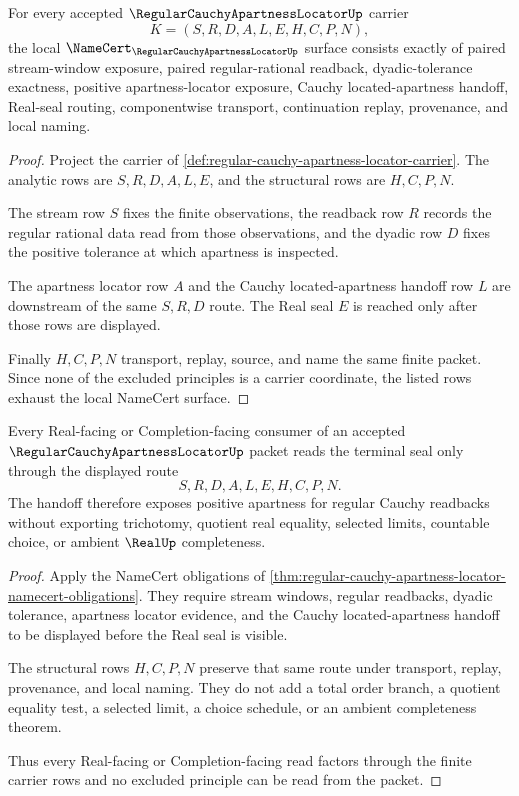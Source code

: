 \begin{theorem}
\label{thm:regular-cauchy-apartness-locator-namecert-obligations}
For every accepted $\RegularCauchyApartnessLocatorUp$ carrier
$$
K=(S,R,D,A,L,E,H,C,P,N),
$$
the local $\NameCert_{\RegularCauchyApartnessLocatorUp}$ surface consists exactly of paired stream-window exposure, paired regular-rational readback, dyadic-tolerance exactness, positive apartness-locator exposure, Cauchy located-apartness handoff, Real-seal routing, componentwise transport, continuation replay, provenance, and local naming.
\end{theorem}
\begin{proof}
Project the carrier of \autoref{def:regular-cauchy-apartness-locator-carrier}. The analytic rows are $S,R,D,A,L,E$, and the structural rows are $H,C,P,N$.

The stream row $S$ fixes the finite observations, the readback row $R$ records the regular rational data read from those observations, and the dyadic row $D$ fixes the positive tolerance at which apartness is inspected.

The apartness locator row $A$ and the Cauchy located-apartness handoff row $L$ are downstream of the same $S,R,D$ route. The Real seal $E$ is reached only after those rows are displayed.

Finally $H,C,P,N$ transport, replay, source, and name the same finite packet. Since none of the excluded principles is a carrier coordinate, the listed rows exhaust the local NameCert surface.
\end{proof}

\begin{theorem}
\label{thm:regular-cauchy-apartness-locator-real-handoff}
Every Real-facing or Completion-facing consumer of an accepted $\RegularCauchyApartnessLocatorUp$ packet reads the terminal seal only through the displayed route
$$
S,R,D,A,L,E,H,C,P,N .
$$
The handoff therefore exposes positive apartness for regular Cauchy readbacks without exporting trichotomy, quotient real equality, selected limits, countable choice, or ambient $\RealUp$ completeness.
\end{theorem}
\begin{proof}
Apply the NameCert obligations of \autoref{thm:regular-cauchy-apartness-locator-namecert-obligations}. They require stream windows, regular readbacks, dyadic tolerance, apartness locator evidence, and the Cauchy located-apartness handoff to be displayed before the Real seal is visible.

The structural rows $H,C,P,N$ preserve that same route under transport, replay, provenance, and local naming. They do not add a total order branch, a quotient equality test, a selected limit, a choice schedule, or an ambient completeness theorem.

Thus every Real-facing or Completion-facing read factors through the finite carrier rows and no excluded principle can be read from the packet.
\end{proof}

